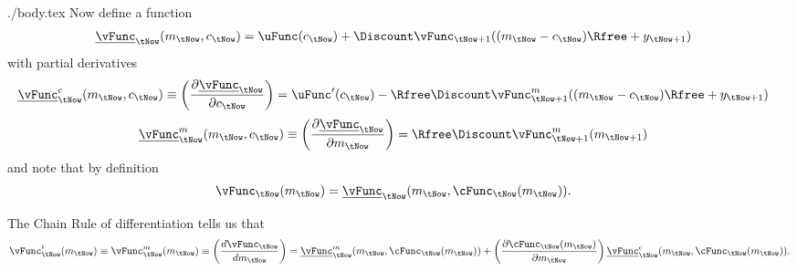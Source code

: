 \documentclass{handout}
\begin{document}
\begin{verbatimwrite}{./body.tex}
Now define a function 
\begin{equation}\begin{gathered}\begin{aligned}
        \underline{\vFunc}_{\tNow}({m}_{\tNow},{c}_{\tNow}) & =  \uFunc({c}_{\tNow})+\Discount \vFunc_{\tNow+1}(({m}_{\tNow}-{c}_{\tNow})\Rfree+{y}_{\tNow+1})
\end{aligned}\end{gathered}\end{equation}
with partial derivatives
\begin{equation}\begin{gathered}\begin{aligned}
        \underline{\vFunc}^{c}_{\tNow}({m}_{\tNow},{c}_{\tNow}) \equiv \left(\frac{\partial \underline{\vFunc}_{\tNow}}{\partial {c}_{\tNow}}\right) & =  
        \uFunc^{\prime}({c}_{\tNow}) - \Rfree\Discount \vFunc_{\tNow+1}^{m}(({m}_{\tNow}-{c}_{\tNow})\Rfree+{y}_{\tNow+1}) \label{eq:nuc}
\end{aligned}\end{gathered}\end{equation}
\begin{equation}\begin{gathered}\begin{aligned}
      \underline{\vFunc}^{{m}}_{\tNow}({m}_{\tNow},{c}_{\tNow}) \equiv \left(\frac{\partial \underline{\vFunc}_{\tNow}}{\partial {m}_{\tNow}}\right) & =  \Rfree \Discount \vFunc_{\tNow+1}^{{m}}({m}_{\tNow+1}) \label{eq:nuprimevtp1}
\end{aligned}\end{gathered}\end{equation}
and note that by definition
\begin{equation}\begin{gathered}\begin{aligned}
        \vFunc_{\tNow}({m}_{\tNow}) & =  \underline{\vFunc}_{\tNow}({m}_{\tNow},\cFunc_{\tNow}({m}_{\tNow})).
\end{aligned}\end{gathered}\end{equation}

The Chain Rule of differentiation tells us that 
\begin{equation}\begin{gathered}\begin{aligned}
        \vFunc^{\prime}_{\tNow}({m}_{\tNow})\equiv \vFunc_{\tNow}^{{m}}({m}_{\tNow}) \equiv \left(\frac{d \vFunc_{\tNow}}{d {m}_{\tNow}}\right) & =  \underline{\vFunc}_{\tNow}^{{m}}({m}_{\tNow},\cFunc_{\tNow}({m}_{\tNow})) + \left(\frac{\partial \cFunc_{\tNow}({m}_{\tNow})}{\partial {m}_{\tNow}}\right)\underline{\vFunc}_{\tNow}^{c}({m}_{\tNow},\cFunc_{\tNow}({m}_{\tNow})). \nonumber
\\ \label{eq:partdiff}
\end{aligned}\end{gathered}\end{equation}


\end{verbatimwrite}
\end{document}
